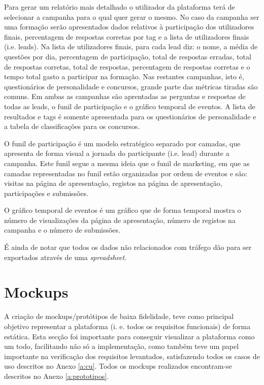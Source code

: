 Para gerar um relatório mais detalhado o utilizador da plataforma terá de selecionar a campanha para o qual quer gerar o mesmo. No caso da campanha ser uma formação serão apresentados dados relativos à participação dos utilizadores finais, percentagem de respostas corretas por tag e a lista de utilizadores finais (i.e. leads). Na lista de utilizadores finais, para cada lead diz: o nome, a média de questões por dia, percentagem de participação, total de respostas erradas, total de respostas corretas, total de respostas, percentagem de respostas corretas e o tempo total gasto a participar na formação. 
Nas restantes campanhas, isto é, questionários de personalidade e concursos, grande parte das métricas tiradas são comuns. Em ambas as campanhas são aprentadas as perguntas e respostas de todas as leads, o funil de participação e o gráfico temporal de eventos. A lista de resultados e tags é somente apresentada para os questionários de personalidade e a tabela de classificações para os concursos. 

O funil de participação é um modelo estratégico separado por camadas, que apresenta de forma visual a jornada do participante (i.e. lead) durante a campanha. Este funil segue a mesma ideia que o funil de marketing\cite{f8}\cite{f9}, em que as camadas representadas no funil estão organizadas por ordem de eventos e são: visitas na página de apresentação, registos na página de apresentação, participações e submissões.

O gráfico temporal de eventos é um gráfico que de forma temporal mostra o número de visualizações da página de apresentação, número de registos na campanha e o número de submissões.

É ainda de notar que todos os dados não relacionados com tráfego dão para ser exportados através de uma \textit{spreadsheet}.


\section{Mockups}
\label{prototipagem}

A criação de mockups/protótipos de baixa fidelidade, teve como principal objetivo representar a plataforma (i. e. todos os requisitos funcionais) de forma estática. Esta secção foi importante para conseguir visualizar a plataforma como um todo, facilitando não só a implementação, como também teve um papel importante na verificação dos requisitos levantados, satisfazendo todos os casos de uso descritos no Anexo \ref{a:cu}. Todos os mockups realizados encontram-se descritos no Anexo \ref{a:prototipos}.


\blankpage

\glsresetall